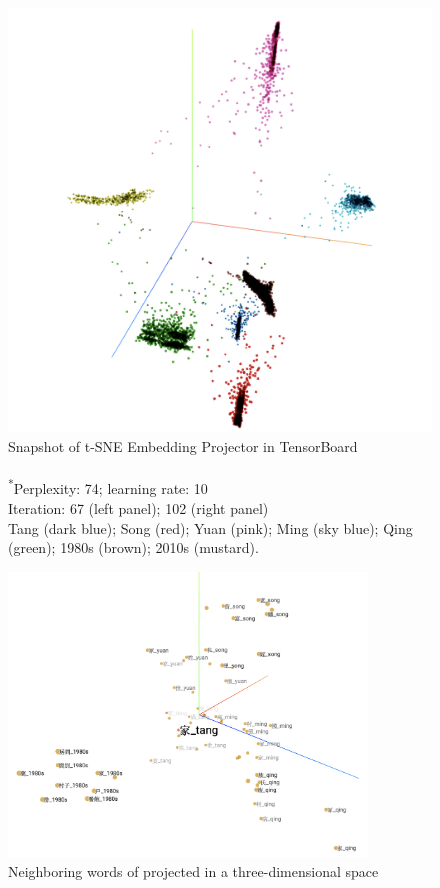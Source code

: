 \begin{figure}[H]
\begin{minipage}[b]{0.45\linewidth}
    \includegraphics[width=\textwidth]{figures_new/from_old/tsne_embedding_projector_102}
  \end{minipage}
  \caption[Snapshot of t-SNE Embedding Projector in TensorBoard]%
  {Snapshot of t-SNE Embedding Projector in TensorBoard\\%
    \footnotesize{\\\textsuperscript{*}Perplexity: 74; learning rate: 10\\Iteration: 67 (left panel); 102 (right panel)\\\text{*} Tang (dark blue); Song (red); Yuan (pink); Ming (sky blue); Qing (green); 1980s (brown); 2010s (mustard).}}
\end{figure}

\begin{figure}[H]
  \centering
  \includegraphics[height=0.45\textheight,width=0.85\textwidth,keepaspectratio]{figures_new/from_old/jia_neighboring_words}
  \caption{Neighboring words of \jia projected in a three-dimensional space}
  \label{fig:jia_neighboring_words}
\end{figure}

